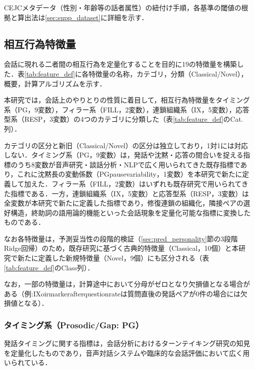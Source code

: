 \documentclass[dvipdfmx,11pt,a4paper]{bxjsarticle}
\renewcommand{\_}{\paperorigunderscore\allowbreak}%
\begin{document}
CEJCメタデータ（性別・年齢等の話者属性）の紐付け手順，各基準の閾値の根拠と算出法は\ref{sec:supp_dataset}に詳細を示す．


\subsection{相互行為特徴量}
\label{sec:features}


会話に現れる二者間の相互行為を定量化することを目的に19の特徴量を構築した．表\ref{tab:feature_def}に各特徴量の名称，カテゴリ，分類（Classical/Novel），概要，計算アルゴリズムを示す．



本研究では，会話上のやりとりの性質に着目して，相互行為特徴量をタイミング系（PG，9変数），フィラー系（FILL，2変数），連鎖組織系（IX，5変数），応答型系（RESP，3変数）の4つのカテゴリに分類した（表\ref{tab:feature_def}のCat.列）．

カテゴリの区分と新旧（Classical/Novel）の区分は独立しており，1対1には対応しない．タイミング系（PG，9変数）は，発話や沈黙・応答の間合いを捉える指標のうち8変数が音声研究・談話分析・NLPで広く用いられてきた既存指標であり，これに沈黙長の変動係数（PG\_pause\_variability，1変数）を本研究で新たに定義して加えた．フィラー系（FILL，2変数）はいずれも既存研究で用いられてきた指標である．一方，連鎖組織系（IX，5変数）と応答型系（RESP，3変数）は全変数が本研究で新たに定義した指標であり，修復連鎖の組織化\cite{schegloff1977}，隣接ペアの選好構造\cite{sacks1974}，終助詞の語用論的機能といった会話現象を定量化可能な指標に変換したものである．

なお各特徴量は，予測妥当性の段階的検証（\ref{sec:pred_personality}節の3段階Ridge回帰）のため，既存研究に基づく古典的特徴量（Classical，10個）と本研究で新たに定義した新規特徴量（Novel，9個）にも区分される（表\ref{tab:feature_def}のClass列）．

なお，一部の特徴量は，計算途中において分母がゼロとなり欠損値となる場合がある（例:IX\_oirmarker\_after\_question\_rateは質問直後の発話ペアが0件の場合には欠損値となる）．


\subsubsection{タイミング系（Prosodic/Gap: PG）}
発話タイミングに関する指標は，会話分析におけるターンテイキング研究\cite{sacks1974}の知見を定量化したものであり，音声対話システムや臨床的な会話評価において広く用いられている\cite{levitan2012,deruiter2006}．
\end{document}

